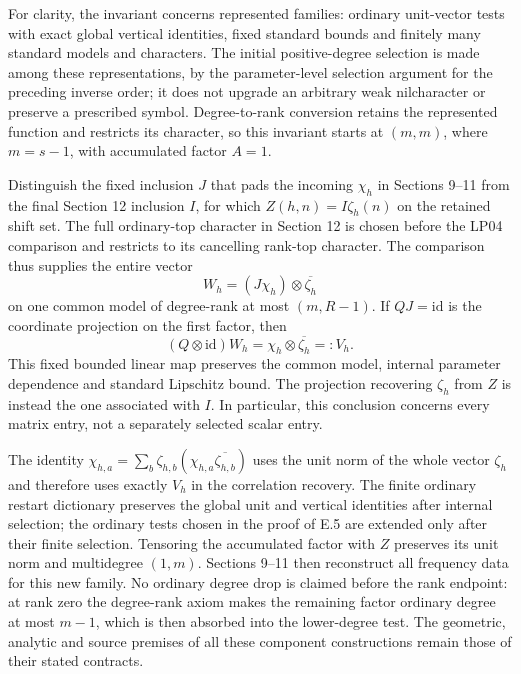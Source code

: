 \documentclass[11pt]{article}
\begin{document}
\begin{enumerate}
For clarity, the invariant concerns represented families: ordinary
unit-vector tests with exact global vertical identities, fixed standard
bounds and finitely many standard models and characters. The initial
positive-degree selection is made among these representations, by the
parameter-level selection argument for the preceding inverse order;
it does not upgrade an arbitrary weak nilcharacter or preserve a
prescribed symbol. Degree-to-rank conversion retains the represented
function and restricts its character, so this invariant starts at
$(m,m)$, where $m=s-1$, with accumulated factor $A=1$.

Distinguish the fixed inclusion $J$ that pads the incoming $\chi_h$
in Sections 9--11 from the final Section 12 inclusion $I$, for which
$Z(h,n)=I\zeta_h(n)$ on the retained shift set. The full ordinary-top
character in Section 12 is chosen before the LP04 comparison and
restricts to its cancelling rank-top character. The comparison thus
supplies the entire vector
\[
 W_h=(J\chi_h)\otimes\overline{\zeta_h}
\]
on one common model of degree-rank at most $(m,R-1)$. If $QJ=\mathrm{id}$
is the coordinate projection on the first factor, then
\[
 (Q\otimes\mathrm{id})W_h
   =\chi_h\otimes\overline{\zeta_h}=:V_h.
\]
This fixed bounded linear map preserves the common model, internal
parameter dependence and standard Lipschitz bound. The projection
recovering $\zeta_h$ from $Z$ is instead the one associated with $I$.
In particular, this conclusion concerns every matrix entry, not a
separately selected scalar entry.

The identity
$\chi_{h,a}=\sum_b\zeta_{h,b}(\chi_{h,a}\overline{\zeta_{h,b}})$
uses the unit norm of the whole vector $\zeta_h$ and therefore uses
exactly $V_h$ in the correlation recovery. The finite ordinary restart
dictionary preserves the global unit and vertical identities after
internal selection; the ordinary tests chosen in the proof of E.5 are
extended only after their finite selection. Tensoring the accumulated
factor with $Z$ preserves its unit norm and multidegree $(1,m)$.
Sections 9--11 then reconstruct all frequency data for this new family.
No ordinary degree drop is claimed before the rank endpoint: at rank
zero the degree-rank axiom makes the remaining factor ordinary degree
at most $m-1$, which is then absorbed into the lower-degree test.
The geometric, analytic and source premises of all these component
constructions remain those of their stated contracts.


\end{enumerate}
\end{document}
